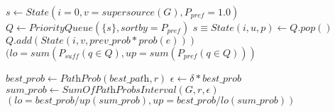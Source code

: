 \begin{algorithm}[H]
\begin{algorithmic}[1]
			\State $s \gets \mathit{State}(i=0, v=\textit{supersource}(G), \mathit{P_{pref}}=1.0)$
			\Statex {} 
			\State $Q \gets \mathit{PriorityQueue}(\{ s \}, sortby=\mathit{P_{pref}})$
			  
				\State $s \equiv \mathit{State}(i, u, p) \gets Q.pop()$
						\State $\mathit{Q.add}(\mathit{State}(i, v, \mathit{prev\_prob} \ast \mathit{prob}(e)))$
					\EndIf
				\EndFor
			\EndWhile
			\Return $(lo=\mathit{sum}( \mathit{P_{suff}}(q \in Q), up=\mathit{sum}( \mathit{P_{pref}}(q \in Q) ) )$
		\EndFunction

		\Statex

			\State $\textit{best\_prob} \gets \textit{PathProb}(\textit{best\_path}, r)$
			\State $\epsilon \gets \delta \ast \textit{best\_prob}$
			\State $\textit{sum\_prob} \gets \textit{SumOfPathProbsInterval}(G, r, \epsilon)$
			\Return $( \textit{lo} = \textit{best\_prob} / \textit{up}(\textit{sum\_prob}), \textit{up} = \textit{best\_prob} / \textit{lo}(\textit{sum\_prob}) )$
		\EndFunction
	\end{algorithmic}
\end{algorithm}

